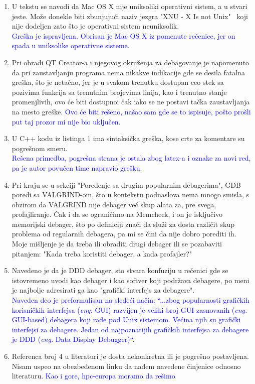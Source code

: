 \documentclass[a4paper]{report}
\newcommand{\odgovor}[1]{\textcolor{blue}{#1}}
\begin{document}
\begin{enumerate}
	\item U tekstu se navodi da Mac OS X nije uniksoliki operativni sistem, a u stvari jeste. Može donekle biti zbunjujući naziv jezgra "XNU - X Is not Unix" \ koji nije dodeljen zato što je operativni sistem neuniksolik.\\
	\odgovor{Greška je ispravljena. Obrisan je Mac OS X iz pomenute rečenice, jer on spada u uniksolike operativne sisteme.}
	\item Pri obradi QT Creator-a i njegovog okruženja za debagovanje je napomenuto da pri zaustavljanju programa nema nikakve indikacije gde se desila fatalna greška, što je netačno, jer je u svakom trenutku dostupan ceo stek sa pozivima funkcija sa trenutnim brojevima linija, kao i trenutno stanje promenjlivih, ovo će biti dostupnoi čak iako se ne postavi tačka zaustavljanja na mesto greške.
	\odgovor{Ovo će biti rešeno, našao sam gde se to ispisuje, pošto prošli put taj prozor mi nije bio uključen.}
           \item U C++ kodu iz listinga 1 ima sintaksička greška, kose crte za komentare su pogrešnom smeru.  \\
	\odgovor{Rešena primedba, pogrešna strana je ostala zbog latex-a i oznake za novi red, pa je autor povučen time napravio grešku.}
	\item Pri kraju se u sekciji "Poređenje sa drugim popularnim debagerima", GDB poredi sa VALGRIND-om, što u kontekstu podnaslova nema mnogo smisla, s obzirom da VALGRIND nije debager već skup alata za, pre svega, profajliranje. Čak i da se ograničimo na Memcheck, i on je isključivo memorijski debager, što po definiciji znači da služi za dosta različit skup problema od regularnih debagera, pa mi se čini da nije dobro porediti ih. Moje mišljenje je da treba ili obraditi drugi debager ili se pozabaviti pitanjem: "Kada treba koristiti debager, a kada profajler?"
	\item Navedeno je da je DDD debager, sto stvara konfuziju u rečenici gde se istovremeno uvodi kao debager i kao softver koji podržava debagere, po meni je najbolje adresirati ga kao "grafički interfejs za debagere". \\
	\odgovor{Naveden deo je preformulisan na sledeći način:  ``...zbog popularnosti grafičkih korisničkih interfejsa
(\textit{eng.} GUI) razvijen je veliki broj GUI zasnovanih (\textit{eng.} GUI-based) debagera koji rade pod Unix sistemom. Većina njih su grafički interfejsi za debagere. Jedan od najpoznatijih grafičkih interfejsa za debagere je DDD (\textit{eng.} Data Display Debugger)``.} 
	\item Referenca broj 4 u literaturi je dosta nekonkretna ili je pogrešno postavljena. Nisam uspeo na obezbeđenom linku da nađem navedene činjenice odnosno literaturu.
    \odgovor{Kao i gore, hpc-europa moramo da rešimo}

 
\end{enumerate}
\end{document}
